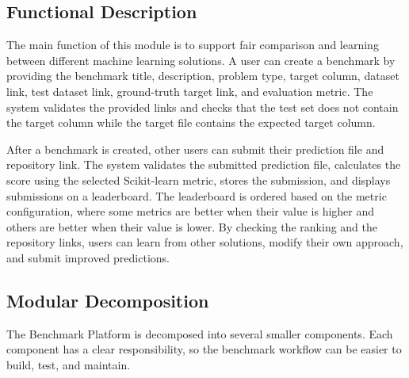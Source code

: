 \documentclass[12pt,a4paper]{report}
\begin{document}
\subsection{Functional Description}
\noindent The main function of this module is to support fair comparison and
learning between different machine learning solutions. A user can create a
benchmark by providing the benchmark title, description, problem type, target
column, dataset link, test dataset link, ground-truth target link, and
evaluation metric. The system validates the provided links and checks that the
test set does not contain the target column while the target file contains the
expected target column.

\noindent After a benchmark is created, other users can submit their prediction
file and repository link. The system validates the submitted prediction file,
calculates the score using the selected Scikit-learn metric, stores the
submission, and displays submissions on a leaderboard. The leaderboard is
ordered based on the metric configuration, where some metrics are better when
their value is higher and others are better when their value is lower. By
checking the ranking and the repository links, users can learn from other
solutions, modify their own approach, and submit improved predictions.

\subsection{Modular Decomposition}
\noindent The Benchmark Platform is decomposed into several smaller components. Each
component has a clear responsibility, so the benchmark workflow can be easier to
build, test, and maintain.
\end{document}
